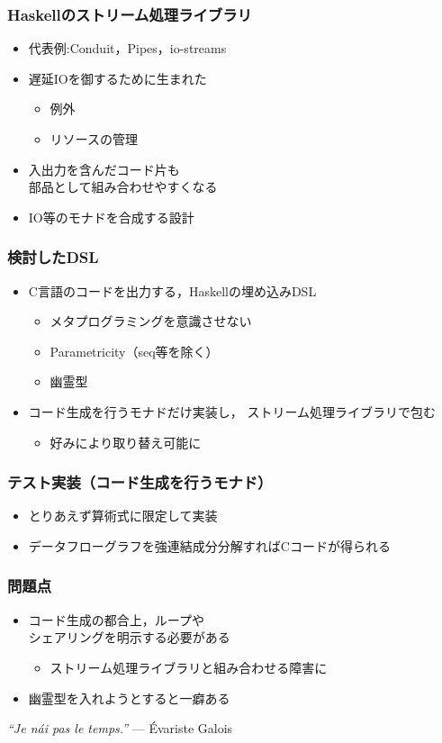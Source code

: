 \documentclass[dvipdfmx,cjk,xcolor=dvipsnames,envcountsect,notheorems,12pt]{beamer}
\theoremstyle{definition}
\begin{document}
\begin{frame}
	\frametitle{Haskellのストリーム処理ライブラリ}
	\begin{itemize}
		\item 代表例:Conduit，Pipes，io-streams
		\item 遅延IOを御するために生まれた
			\begin{itemize}
				\item 例外
				\item リソースの管理
			\end{itemize}
		\item 入出力を含んだコード片も\\部品として組み合わせやすくなる
		\item IO等のモナドを合成する設計
	\end{itemize}
\end{frame}

\begin{frame}
	\frametitle{検討したDSL}
	\begin{itemize}
		\item C言語のコードを出力する，Haskellの埋め込みDSL
			\begin{itemize}
				\item メタプログラミングを意識させない
				\item Parametricity（seq等を除く）
				\item 幽霊型
			\end{itemize}
		\item コード生成を行うモナドだけ実装し，
			ストリーム処理ライブラリで包む
			\begin{itemize}
				\item 好みにより取り替え可能に
			\end{itemize}
	\end{itemize}
\end{frame}

\begin{frame}
	\frametitle{テスト実装（コード生成を行うモナド）}
	\begin{itemize}
		\item とりあえず算術式に限定して実装
		\item データフローグラフを強連結成分分解すればCコードが得られる
	\end{itemize}
\end{frame}

\begin{frame}
	\frametitle{問題点}
	\begin{itemize}
		\item コード生成の都合上，ループや\\シェアリングを明示する必要がある
			\begin{itemize}
				\item ストリーム処理ライブラリと組み合わせる障害に
			\end{itemize}
		\item 幽霊型を入れようとすると一癖ある
	\end{itemize}
	\Large
	\begin{center}
		\textit{``Je n\'ai pas le temps.''} --- \'Evariste Galois
	\end{center}
\end{frame}
\end{document}
